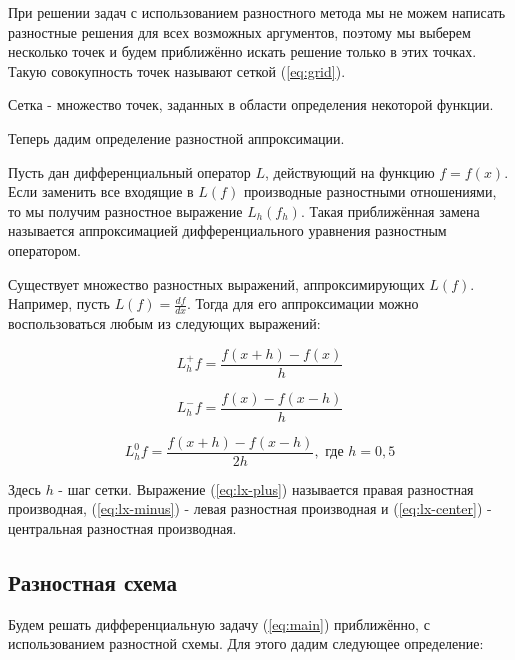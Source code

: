 При решении задач с использованием разностного метода мы не можем написать разностные решения для всех возможных аргументов,
поэтому мы выберем несколько точек и будем приближённо искать решение только в этих точках. Такую совокупность точек
называют сеткой (\ref{eq:grid}).

\begin{definition}
    \label{eq:grid}
    Сетка - множество точек, заданных в области определения некоторой функции.
\end{definition}

Теперь дадим определение разностной аппроксимации.

\begin{definition}
    Пусть дан дифференциальный оператор $L$, действующий на функцию $f = f(x)$. Если заменить все входящие в $L(f)$
    производные разностными отношениями, то мы получим разностное выражение $L_h(f_h)$. Такая приближённая замена называется
    аппроксимацией дифференциального уравнения разностным оператором.
\end{definition}

Существует множество разностных выражений, аппроксимирующих $L(f)$. Например, пусть $L(f) = \frac{df}{dx}$. Тогда для его
аппроксимации можно воспользоваться любым из следующих выражений:

\begin{equation}
    \label{eq:lx-plus}
    L_h^+f = \frac{f(x + h) - f(x)}{h}
\end{equation}

\begin{equation}
    \label{eq:lx-minus}
    L_h^-f = \frac{f(x) - f(x - h)}{h}
\end{equation}

\begin{equation}
    \label{eq:lx-center}
    L_h^0f = \frac{f(x + h) - f(x - h)}{2h}, \text{ где } h = 0,5
\end{equation}

\noindent Здесь $h$ - шаг сетки. Выражение (\ref{eq:lx-plus}) называется правая разностная производная, (\ref{eq:lx-minus})
- левая разностная производная и (\ref{eq:lx-center}) - центральная разностная производная.

\subsection{Разностная схема}

Будем решать дифференциальную задачу (\ref{eq:main}) приближённо, с использованием разностной схемы. Для этого дадим следующее
определение:

